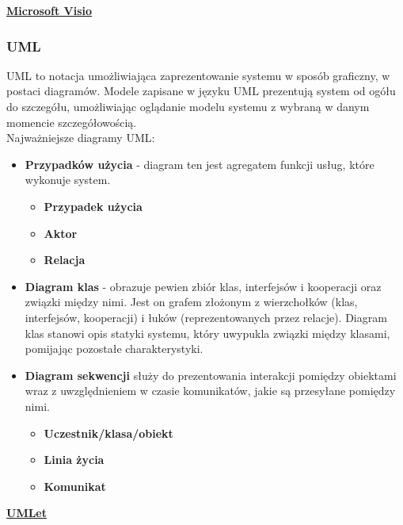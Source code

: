 \underline{\textbf{Microsoft Visio}}

\subsubsection{UML}

UML to notacja umożliwiająca zaprezentowanie systemu w sposób graficzny, w postaci diagramów. Modele zapisane w języku UML prezentują system od ogółu do szczegółu, umożliwiając oglądanie modelu systemu z wybraną w danym momencie szczegółowością. \\

Najważniejsze diagramy UML:

\begin{itemize}
	\item \textbf{Przypadków użycia} - diagram ten jest agregatem funkcji usług, które wykonuje system.
	\begin{itemize}
		\item \textbf{Przypadek użycia}
		\item \textbf{Aktor}
		\item \textbf{Relacja}
	\end{itemize}
	\item \textbf{Diagram klas} - obrazuje pewien zbiór klas, interfejsów i kooperacji oraz związki między nimi. Jest on grafem złożonym z wierzchołków (klas, interfejsów, kooperacji) i łuków (reprezentowanych przez relacje). Diagram klas stanowi opis statyki systemu, który uwypukla związki między klasami, pomijając pozostałe charakterystyki. 
	\item \textbf{Diagram sekwencji} służy do prezentowania interakcji pomiędzy obiektami wraz z uwzględnieniem w czasie komunikatów, jakie są przesyłane pomiędzy nimi. 
	\begin{itemize}
		\item \textbf{Uczestnik/klasa/obiekt}
		\item \textbf{Linia życia}
		\item \textbf{Komunikat} \\
	\end{itemize}
\end{itemize}

\underline{\textbf{UMLet}}